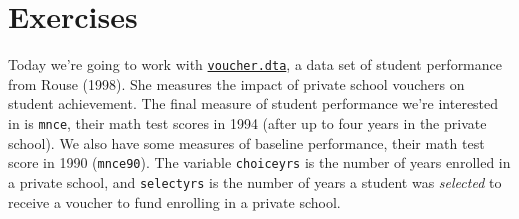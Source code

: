 \documentclass[11pt]{article}
\begin{document}
\hypertarget{exercises}{%
\section*{Exercises}\label{exercises}}

Today we're going to work with
\href{../materials/voucher.dta}{\texttt{voucher.dta}}, a data set of
student performance from Rouse (1998). She measures the impact of
private school vouchers on student achievement. The final measure of
student performance we're interested in is \texttt{mnce}, their math
test scores in 1994 (after up to four years in the private school). We
also have some measures of baseline performance, their math test score
in 1990 (\texttt{mnce90}). The variable \texttt{choiceyrs} is the number
of years enrolled in a private school, and \texttt{selectyrs} is the
number of years a student was \emph{selected} to receive a voucher to
fund enrolling in a private school.\\
\end{document}
